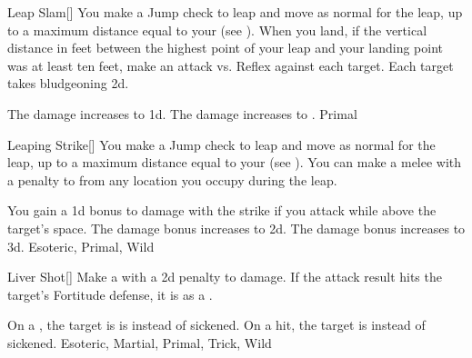 \lowercase{\hypertarget{maneuver:Leap Slam}{}}\label{maneuver:Leap Slam}
\hypertarget{maneuver:Leap Slam}{}
\begin{freeability}[Rank 3]{Leap Slam}[]
You make a Jump check to leap and move as normal for the leap, up to a maximum distance equal to your  (see ).
When you land, if the vertical distance in feet between the highest point of your leap and your landing point was at least ten feet, make an attack vs. Reflex against each target.
\hit Each target takes bludgeoning  \minus2d.

\rankline
{} The damage increases to  \minus1d.
 The damage increases to .
 Primal
\end{freeability}
\vspace{0.25em}



\lowercase{\hypertarget{maneuver:Leaping Strike}{}}\label{maneuver:Leaping Strike}
\hypertarget{maneuver:Leaping Strike}{}
\begin{freeability}[Rank 1]{Leaping Strike}[]
You make a Jump check to leap and move as normal for the leap, up to a maximum distance equal to your  (see ).
You can make a melee  with a  penalty to  from any location you occupy during the leap.

\rankline
{} You gain a \plus1d bonus to damage with the strike if you attack while above the target's space.
 The damage bonus increases to \plus2d.
 The damage bonus increases to \plus3d.
 Esoteric, Primal, Wild
\end{freeability}
\vspace{0.25em}



\lowercase{\hypertarget{maneuver:Liver Shot}{}}\label{maneuver:Liver Shot}
\hypertarget{maneuver:Liver Shot}{}
\begin{freeability}[Rank 3]{Liver Shot}[]
Make a  with a \minus2d penalty to damage.
If the attack result hits the target's Fortitude defense,
it is  as a .

\rankline
{} On a , the target is is  instead of sickened.
 On a hit, the target is  instead of sickened.
 Esoteric, Martial, Primal, Trick, Wild
\end{freeability}
\vspace{0.25em}



